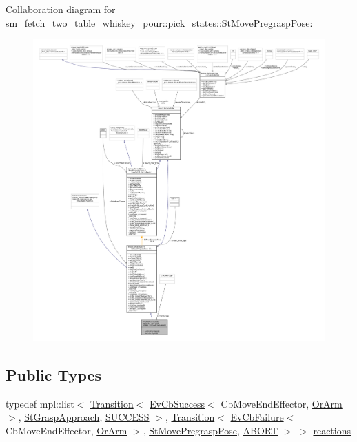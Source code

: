Collaboration diagram for sm\+\_\+fetch\+\_\+two\+\_\+table\+\_\+whiskey\+\_\+pour\+:\+:pick\+\_\+states\+:\+:St\+Move\+Pregrasp\+Pose\+:
\nopagebreak
\begin{figure}[H]
\begin{center}
\leavevmode
\includegraphics[width=350pt]{structsm__fetch__two__table__whiskey__pour_1_1pick__states_1_1StMovePregraspPose__coll__graph}
\end{center}
\end{figure}
\subsection*{Public Types}
\begin{DoxyCompactItemize}
\item 
typedef mpl\+::list$<$ \hyperlink{classsmacc_1_1Transition}{Transition}$<$ \hyperlink{structsmacc_1_1EvCbSuccess}{Ev\+Cb\+Success}$<$ Cb\+Move\+End\+Effector, \hyperlink{classsm__fetch__two__table__whiskey__pour_1_1OrArm}{Or\+Arm} $>$, \hyperlink{structsm__fetch__two__table__whiskey__pour_1_1pick__states_1_1StGraspApproach}{St\+Grasp\+Approach}, \hyperlink{structsmacc_1_1default__transition__tags_1_1SUCCESS}{S\+U\+C\+C\+E\+SS} $>$, \hyperlink{classsmacc_1_1Transition}{Transition}$<$ \hyperlink{structsmacc_1_1EvCbFailure}{Ev\+Cb\+Failure}$<$ Cb\+Move\+End\+Effector, \hyperlink{classsm__fetch__two__table__whiskey__pour_1_1OrArm}{Or\+Arm} $>$, \hyperlink{structsm__fetch__two__table__whiskey__pour_1_1pick__states_1_1StMovePregraspPose}{St\+Move\+Pregrasp\+Pose}, \hyperlink{structsmacc_1_1default__transition__tags_1_1ABORT}{A\+B\+O\+RT} $>$ $>$ \hyperlink{structsm__fetch__two__table__whiskey__pour_1_1pick__states_1_1StMovePregraspPose_af0c044fc59209e26f14b1df63b0d5412}{reactions}
\end{DoxyCompactItemize}
